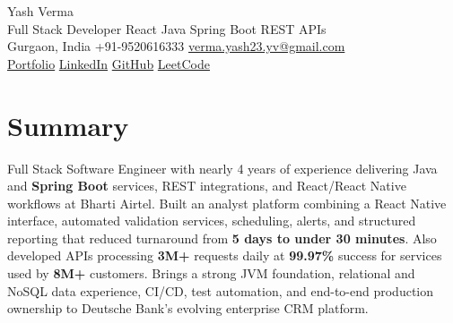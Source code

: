 \documentclass[letterpaper,11pt]{article}
\begin{document}
\begin{center}
  {\Huge Yash Verma} \\
  \small Full Stack Developer \textperiodcentered{} React \textperiodcentered{} Java \textperiodcentered{} Spring Boot \textperiodcentered{} REST APIs \\
  \vspace{5pt}
  \small Gurgaon, India \textbar{} +91-9520616333 \textbar{}
  \href{mailto:verma.yash23.yv@gmail.com}{verma.yash23.yv@gmail.com} \\
  \vspace{7pt}
  \href{https://yashverma230600.github.io/yash-portfolio/}{Portfolio} \textbar{}
  \href{https://www.linkedin.com/in/yash-verma-9243a7193/}{LinkedIn} \textbar{}
  \href{https://github.com/yashverma230600}{GitHub} \textbar{}
  \href{https://leetcode.com/yashverma230600}{LeetCode}
  \vspace{-8pt}
\end{center}

\section{Summary}
\begin{itemize}[leftmargin=0.15in, label={}]
  \small{\item{
    Full Stack Software Engineer with nearly 4 years of experience delivering Java and \textbf{Spring Boot} services, REST integrations, and React/React Native workflows at Bharti Airtel. Built an analyst platform combining a React Native interface, automated validation services, scheduling, alerts, and structured reporting that reduced turnaround from \textbf{5 days to under 30 minutes}. Also developed APIs processing \textbf{3M+} requests daily at \textbf{99.97\%} success for services used by \textbf{8M+} customers. Brings a strong JVM foundation, relational and NoSQL data experience, CI/CD, test automation, and end-to-end production ownership to Deutsche Bank's evolving enterprise CRM platform.
  }}
\end{itemize}
\vspace{-8pt}

\end{document}
